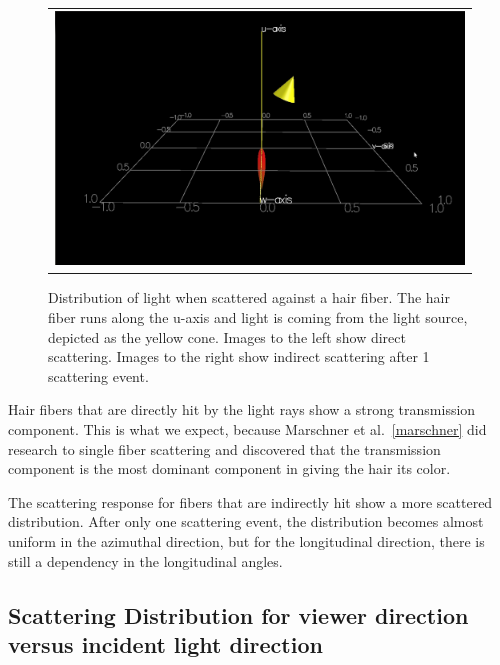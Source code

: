 \documentclass[11pt,a4paper]{report}
\begin{document}
\begin{figure}[h]
\begin{tabular}{c}
\includegraphics[scale=0.2]{images/theta67_strands1_colorR.jpeg} \\
\end{tabular}

\caption{Distribution of light when scattered against a hair fiber. The hair fiber runs along the u-axis and light is coming from the light source, depicted as the yellow cone. Images to the left show direct scattering. Images to the right show indirect scattering after 1 scattering event.}
\label{visual_light_distribution}

\end{figure}

Hair fibers that are directly hit by the light rays show a strong transmission component. This is what we expect, because Marschner et al.~\ref{marschner} did research to single fiber scattering and discovered that the transmission component is the most dominant component in giving the hair its color.

The scattering response for fibers that are indirectly hit show a more scattered distribution. After only one scattering event, the distribution becomes almost uniform in the azimuthal direction, but for the longitudinal direction, there is still a dependency in the longitudinal angles.

\subsection{Scattering Distribution for viewer direction versus incident light direction}
\end{document}
